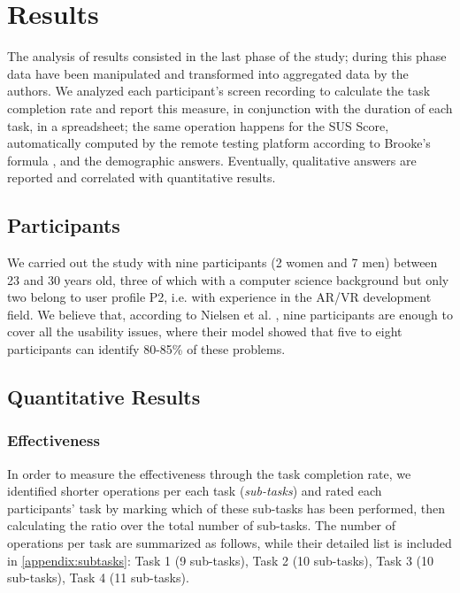 \section{Results}
\label{sec:evaluation-results}
The analysis of results consisted in the last phase of the study; during this phase data have been manipulated and transformed into aggregated data by the authors. We analyzed each participant's screen recording to calculate the task completion rate and report this measure, in conjunction with the duration of each task, in a spreadsheet; the same operation happens for the SUS Score, automatically computed by the remote testing platform according to Brooke's formula \cite{brooke_sus_1996}, and the demographic answers. Eventually, qualitative answers are reported and correlated with quantitative results.

\subsection*{Participants}
We carried out the study with nine participants (2 women and 7 men) between 23 and 30 years old, three of which with a computer science background but only two belong to user profile P2, i.e. with experience in the AR/VR development field. We believe that, according to Nielsen et al. \cite{nielsen_mathematical_model_usability}, nine participants are enough to cover all the usability issues, where their model showed that five to eight participants can identify 80-85\% of these problems.

\subsection{Quantitative Results}
\subsubsection*{Effectiveness}
In order to measure the effectiveness through the task completion rate, we identified shorter operations per each task (\emph{sub-tasks}) and rated each participants' task by marking which of these sub-tasks has been performed, then calculating the ratio over the total number of sub-tasks. The number of operations per task are summarized as follows, while their detailed list is included in \autoref{appendix:subtasks}: Task 1 (9 sub-tasks), Task 2 (10 sub-tasks), Task 3 (10 sub-tasks), Task 4 (11 sub-tasks).

